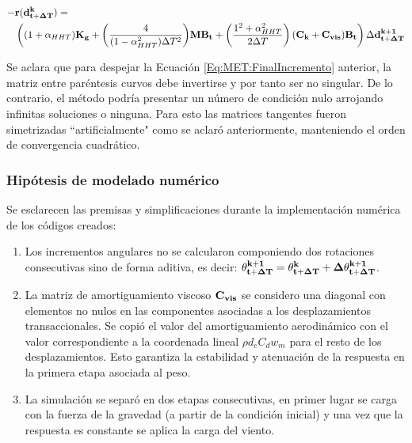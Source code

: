 \begin{equation}\label{Eq:MET:FinalIncremento}
	\begin{split}
		-&\bf{r}(\bf{d}^k_{t+\Delta T})=\\
		&\left((1+\alpha_{HHT})\bf{K}_g+\text{$\left( \frac{4}{(1-\alpha_{HHT}^2)\Delta T^2} \right)$} \bf{M}\bf{B}_t + \left(\text{$\frac{1^2+\alpha^2_{HHT}}{2\Delta T}$}\right) (\bf{C}_k+\bf{C}_{vis}) \bf{B}_t \right)\Delta\bf{d}^{k+1}_{t+\Delta T}
	\end{split}
\end{equation}

Se aclara que para despejar la Ecuación \eqref{Eq:MET:FinalIncremento} anterior, la matriz entre paréntesis curvos debe invertirse y por tanto ser no singular. De lo contrario, el método podría presentar un número de condición nulo arrojando infinitas soluciones o ninguna. Para esto las matrices tangentes fueron simetrizadas ``artificialmente" como se aclaró anteriormente, manteniendo el orden de convergencia cuadrático.


\subsubsection{Hipótesis de modelado numérico}\label{Sec:MET:HipotesisModeladoNumerico}
Se esclarecen las premisas y simplificaciones durante la implementación numérica de los códigos creados: 
\begin{enumerate}
	\item Los incrementos angulares no se calcularon componiendo dos rotaciones consecutivas sino de forma aditiva, es decir: $\bf{\theta_{t+\Delta T}^{k+1}}=\bf{\theta_{t+\Delta T}^{k}}+\bf{\Delta \theta_{t+\Delta T}^{k+1}}$.
	\item La matriz de amortiguamiento viscoso $\bf{C}_{vis}$ se considero una diagonal con elementos no nulos en las componentes asociadas a los desplazamientos transaccionales. Se copió el valor del amortiguamiento aerodinámico con el valor correspondiente a la coordenada lineal $\rho d_c C_d w_m$ para el resto de los desplazamientos. Esto garantiza la estabilidad y atenuación de la respuesta en la primera etapa asociada al peso.
	\item La simulación se separó en dos etapas consecutivas, en primer lugar se carga con la fuerza de la gravedad (a partir de la condición inicial) y una vez que la respuesta es constante se aplica la carga del viento. 
\end{enumerate}  



